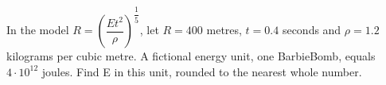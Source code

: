 In the model $R=(\dfrac{Et^2}{\rho})^{\dfrac{1}{5}}$, let $R=400$ metres, $t=0.4$ seconds and $\rho=1.2$ kilograms per cubic metre. A fictional energy unit, one BarbieBomb, equals $4\cdot10^{12}$ joules. Find E in this unit, rounded to the nearest whole number.
